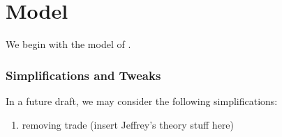 \documentclass{article}
\begin{document}




\section{Model}

We begin with the model of \citep{monte_commuting_2018}.




\subsubsection{Simplifications and Tweaks}

In a future draft, we may consider the following simplifications: 

\begin{enumerate}
\item removing trade (insert Jeffrey's theory stuff here)
\end{enumerate}
\end{document}

